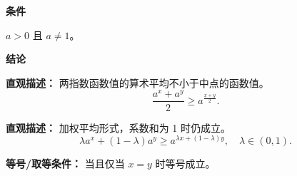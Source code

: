 \begin{statementbox}

\textbf{\textcolor{CStatement}{条件}}
\begin{description}[style=nextline, leftmargin=2.8em, labelsep=0.5em, itemsep=0.35em]
    \item[\textbf{\textcolor{CStatement}{条件 1（底数正且非一）：}}] $a>0$ 且 $a\neq 1$。
\end{description}

\textbf{\textcolor{CStatement}{结论}}
\begin{description}[style=nextline, leftmargin=2.8em, labelsep=0.5em, itemsep=0.45em]
    \item[\textbf{\textcolor{CStatement}{结论一（算术几何平均不等式）：}}]
    \textbf{\textcolor{CStatement}{直观描述：}} 两指数函数值的算术平均不小于中点的函数值。
    \[
    \frac{a^{x}+a^{y}}{2} \geq a^{\frac{x+y}{2}}.
    \]

    \item[\textbf{\textcolor{CStatement}{推广结论（加权凸性形式）：}}]
    \textbf{\textcolor{CStatement}{直观描述：}} 加权平均形式，系数和为 1 时仍成立。
    \[
    \lambda a^{x} + (1-\lambda) a^{y} \geq a^{\lambda x + (1-\lambda)y}, \quad \lambda \in (0,1).
    \]
\end{description}

\textbf{\textcolor{CStatement}{等号/取等条件：}} 当且仅当 $x=y$ 时等号成立。

\end{statementbox}
